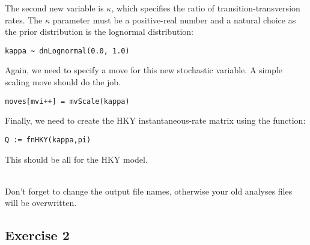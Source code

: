 The second new variable is $\kappa$, which specifies the ratio of transition-transversion rates.
The $\kappa$ parameter must be a positive-real number and a natural choice as the prior distribution is the lognormal distribution:
{\tt \begin{snugshade*}
\begin{lstlisting}
kappa ~ dnLognormal(0.0, 1.0)
\end{lstlisting}
\end{snugshade*}}
Again, we need to specify a move for this new stochastic variable.
A simple scaling move should do the job.
{\tt \begin{snugshade*}
\begin{lstlisting}
moves[mvi++] = mvScale(kappa)
\end{lstlisting}
\end{snugshade*}}

Finally, we need to create the HKY instantaneous-rate matrix using the  function:
{\tt \begin{snugshade*}
\begin{lstlisting}
Q := fnHKY(kappa,pi)
\end{lstlisting}
\end{snugshade*}}
This should be all for the HKY model.

\noindent \\ \impmark Don't forget to change the output file names, otherwise your old analyses files will be overwritten.

\subsection{Exercise 2}

